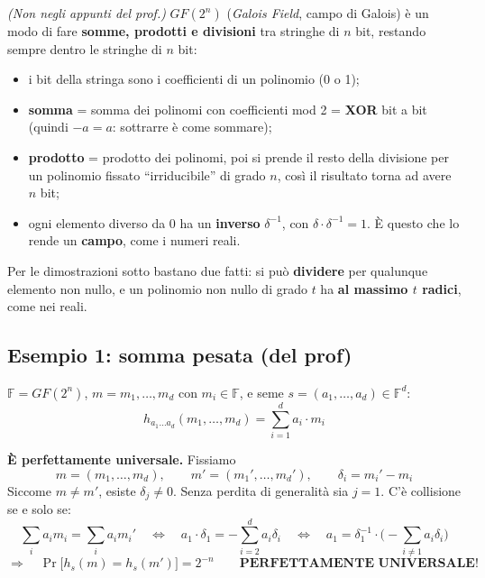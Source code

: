 \begin{nota}
\emph{(Non negli appunti del prof.)} \(GF(2^n)\) (\emph{Galois Field}, campo di Galois) è un modo di fare \textbf{somme, prodotti e divisioni} tra stringhe di \(n\) bit, restando sempre dentro le stringhe di \(n\) bit:
\begin{itemize}
  \item i bit della stringa sono i coefficienti di un polinomio (0 o 1);
  \item \textbf{somma} = somma dei polinomi con coefficienti mod 2 = \textbf{XOR} bit a bit (quindi \(-a = a\): sottrarre è come sommare);
  \item \textbf{prodotto} = prodotto dei polinomi, poi si prende il resto della divisione per un polinomio fissato ``irriducibile'' di grado \(n\), così il risultato torna ad avere \(n\) bit;
  \item ogni elemento diverso da 0 ha un \textbf{inverso} \(\delta^{-1}\), con \(\delta \cdot \delta^{-1} = 1\). È questo che lo rende un \textbf{campo}, come i numeri reali.
\end{itemize}
Per le dimostrazioni sotto bastano due fatti: si può \textbf{dividere} per qualunque elemento non nullo, e un polinomio non nullo di grado \(t\) ha \textbf{al massimo \(t\) radici}, come nei reali.
\end{nota}

\subsection{Esempio 1: somma pesata (del prof)}

\(\mathbb{F} = GF(2^n)\), \(m = m_1, \dots, m_d\) con \(m_i \in \mathbb{F}\), e seme \(s = (a_1, \dots, a_d) \in \mathbb{F}^d\):
\[
h_{a_1 \dots a_d}(m_1, \dots, m_d) = \sum_{i=1}^{d} a_i \cdot m_i
\]

\textbf{È perfettamente universale.} Fissiamo
\[
m = (m_1, \dots, m_d), \qquad m' = (m_1', \dots, m_d'), \qquad \delta_i = m_i' - m_i
\]
Siccome \(m \ne m'\), esiste \(\delta_j \ne 0\). Senza perdita di generalità sia \(j = 1\). C'è collisione se e solo se:
\[
\sum_i a_i m_i = \sum_i a_i m_i' \quad \Longleftrightarrow \quad a_1 \cdot \delta_1 = -\sum_{i=2}^{d} a_i \delta_i \quad \Longleftrightarrow \quad a_1 = \delta_1^{-1} \cdot \Big(-\sum_{i \ne 1} a_i \delta_i\Big)
\]
\[
\Longrightarrow \quad \Pr\big[h_s(m) = h_s(m')\big] = 2^{-n} \qquad \textbf{PERFETTAMENTE UNIVERSALE!}
\]

